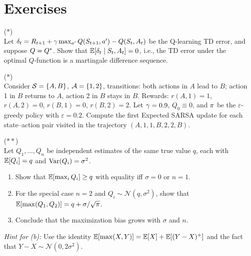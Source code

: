 \documentclass[11pt,a4paper]{article}
\begin{document}
\section{Exercises}
\label{sec:exercises}

\begin{exercise}
\textnormal{(\(*\))} \\
Let $\delta_t = R_{t+1} + \gamma \max_{a'} Q(S_{t+1}, a')
- Q(S_t, A_t)$ be the Q-learning TD error, and suppose
$Q = Q^*$. Show that $\mathbb{E}[\delta_t \mid S_t, A_t] = 0$, i.e.,
the TD error under the optimal $Q$-function is a martingale
difference sequence.
\end{exercise}

\begin{exercise}
\textnormal{(\(*\))} \\
Consider $\mathcal{S} = \{A, B\}$, $\mathcal{A} = \{1, 2\}$, transitions:
both actions in $A$ lead to $B$; action 1 in $B$ returns to $A$,
action 2 in $B$ stays in $B$. Rewards: $r(A, 1) = 1$,
$r(A, 2) = 0$, $r(B, 1) = 0$, $r(B, 2) = 2$. Let
$\gamma = 0.9$, $Q_0 \equiv 0$, and $\pi$ be the
$\varepsilon$-greedy policy with $\varepsilon = 0.2$.
Compute the first Expected SARSA update for each state--action pair
visited in the trajectory $(A, 1, 1, B, 2, 2, B)$.
\end{exercise}

\begin{exercise}
\textnormal{(\(**\))} \\
Let $Q_1, \ldots, Q_n$ be independent estimates of the same true
value $q$, each with $\mathbb{E}[Q_i] = q$ and $\operatorname{Var}(Q_i) = \sigma^2$.
\begin{enumerate}[nosep]
  \item[(a)] Show that $\mathbb{E}[\max_i Q_i] \geq q$ with equality
    iff $\sigma = 0$ or $n = 1$.
  \item[(b)] For the special case $n = 2$ and
    $Q_i \sim \mathcal{N}(q, \sigma^2)$, show that
    $\mathbb{E}[\max(Q_1, Q_2)] = q + \sigma/\sqrt{\pi}$.
  \item[(c)] Conclude that the maximization bias grows with
    $\sigma$ and $n$.
\end{enumerate}
\textit{Hint for (b):} Use the identity
$\mathbb{E}[\max(X,Y)] = \mathbb{E}[X] + \mathbb{E}[(Y-X)^+]$ and the fact that
$Y - X \sim \mathcal{N}(0, 2\sigma^2)$.
\end{exercise}
\end{document}
